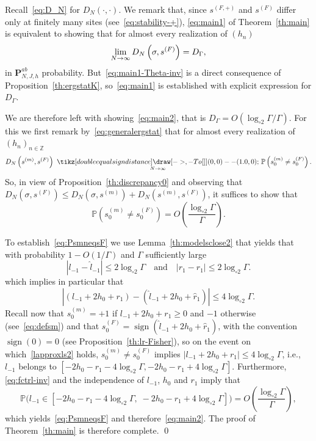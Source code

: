 \documentclass[10pt]{amsart}
\theoremstyle{definition}\newtheorem{defi}[theo]{Definition}\newtheorem{rema}[theo]{Remark}\newtheorem{exam}[theo]{Example}\newtheorem{exem}[theo]{Example}\newtheorem{nota}[theo]{Notation}
\newlength{\LETTERheight}
\newcommand*{\longto}[1]{\ %
{\tikz[double equal sign distance] \draw [->,-{To[]}] (0,0) -- (#1,0);}\ }
\newcommand{\bP}{\mathbf{P}}
\newcommand{\bbP}{\mathbb{P}}
\newcommand{\bbZ}{\mathbb{Z}}
\newcommand{\gG}{\Gamma}
\newcommand{\gs}{\sigma}
\newcommand{\ls}{\widehat{l}}
\newcommand{\rs}{\widehat{r}}
\newcommand{\loglog}{\log_{\circ 2}}
\DeclareMathOperator{\sign}{\mathrm{sign}}
\renewcommand*{\to}{\mathchoice{\longrightarrow}{\rightarrow}{\rightarrow}{\rightarrow}}
\begin{document}
Recall~\eqref{eq:D_N} for $D_N(\cdot, \cdot)$. We remark that, since $s^{(F, +)}$ and $s^{(F)}$ differ only at finitely many sites (see~\eqref{eq:stability-+}), \eqref{eq:main1} of Theorem~\ref{th:main} is equivalent to showing that for almost every realization of $(h_n)$
\begin{equation}\label{eq:main1-Theta-inv}
\lim_{N \to \infty} D_N \left(\gs,s^{(F)}\right)
= D_\gG,
\end{equation}
in $ \bP_{N, J, h}^{ab}$ probability. But~\eqref{eq:main1-Theta-inv} is a direct consequence of Proposition~\ref{th:ergstatK}, so~\eqref{eq:main1} is established with explicit expression for $D_\gG$.


We are therefore left with showing~\eqref{eq:main2}, that is $D_\gG=O(\loglog \gG/ \gG)$. For this we first remark by~\eqref{eq:generalergstat} that for almost every realization of $(h_n)_{n\in\bbZ}$
\begin{equation}
D_N\left(s^{(m)}, s^{(F)}\right)\underset{N\to \infty}{\longto{1.0}} \bbP\left(s_0^{(m)}\neq s_0^{(F)}\right).
\end{equation}
So, in view of Proposition~\ref{th:discrepancy0} and observing that $D_N(\sigma, s^{(F)})\leq D_N(\sigma, s^{(m)})+D_N(s^{(m)}, s^{(F)})$, it suffices to show that
\begin{equation}\label{eq:PsmneqsF}
\bbP\left(s_0^{(m)}\neq s_0^{(F)}\right)=O\left(\frac{\loglog \gG}{\gG}\right).
\end{equation}

To establish~\eqref{eq:PsmneqsF} we use Lemma~\ref{th:modelsclose2} that yields that with probability $1-O(1/\Gamma)$ and $\gG$ sufficiently large
\begin{equation}
|l_{-1}-\ls_{-1}|\le 2 \loglog \Gamma \quad \text{and} \quad \left|r_1-\rs_1\right|\le 2 \loglog\Gamma.
\end{equation}
which implies in particular that
\begin{equation}\label{lapproxls2}
\left|\left(l_{-1}+2h_0+r_1\right)-(\ls_{-1}+2h_0+\rs_1)\right|\le 4\loglog\gG.
\end{equation}
Recall now that $s_0^{(m)}=+1$ if $l_{-1}+2h_0+r_1\ge 0$ and $-1$ otherwise (see~\eqref{eq:defsm}) and that $s_0^{(F)}=\sign(\ls_{-1}+2h_0+\rs_1)$, with the convention $\sign(0)=0$ (see Proposition~\ref{th:lr-Fisher}), so on the event on which~\eqref{lapproxls2} holds, $ s^{(m)}_0 \neq s^{(F)}_0$ implies $|l_{-1}+2h_0+r_1|\le 4\loglog\gG$, i.e., $l_{-1}$ belongs to $ [-2h_0-r_1-4\loglog\gG, -2h_0-r_1+4\loglog\gG]$. Furthermore, \eqref{eq:fctrl-inv} and the independence of $l_{-1}$, $h_0$ and $r_1$ imply that
\begin{equation}
\bbP\bigl(l_{-1}\in \left[-2h_0-r_1-4\loglog\gG,\; -2h_0-r_1+4\loglog\gG\right]\bigr)=O \left(\frac {\loglog \gG}{\gG}\right),
\end{equation}
which yields~\eqref{eq:PsmneqsF} and therefore~\eqref{eq:main2}. The proof of Theorem~\ref{th:main} is therefore complete.
\qed
\end{document}
